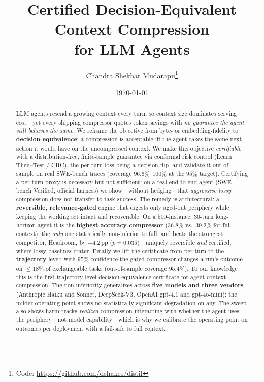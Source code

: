 \documentclass[11pt]{article}
\title{\textbf{Certified Decision-Equivalent Context Compression\\ for LLM Agents}}
\author{%
  Chandra Shekhar Mudarapu\thanks{Code: \url{https://github.com/dshakes/distil}}
}
\date{\today}
\begin{document}
\maketitle

\begin{abstract}
LLM agents resend a growing context every turn, so context size dominates serving cost---yet
every shipping compressor quotes token savings with \emph{no guarantee the agent still behaves
the same}. We reframe the objective from byte- or embedding-fidelity to
\textbf{decision-equivalence}: a compression is acceptable iff the agent takes the same next
action it would have on the uncompressed context. We make this objective \emph{certifiable}
with a distribution-free, finite-sample guarantee via conformal risk control
(Learn--Then--Test / CRC), the per-turn loss being a decision flip, and validate it
out-of-sample on real SWE-bench traces (coverage $96.6\%$--$100\%$ at the $95\%$ target).
Certifying a per-turn proxy is necessary but not sufficient: on a real end-to-end agent
(SWE-bench Verified, official harness) we show---without hedging---that \emph{aggressive lossy}
compression does not transfer to task success. The remedy is architectural: a
\textbf{reversible, relevance-gated} engine that digests only aged-out periphery while keeping
the working set intact and recoverable. On a $500$-instance, $30$-turn long-horizon agent it is
the \textbf{highest-accuracy compressor} ($36.8\%$ vs.\ $39.2\%$ for full context), the
\emph{only} one statistically non-inferior to full, and beats the strongest competitor,
Headroom, by $+4.2$\,pp ($p\!=\!0.035$)---uniquely reversible \emph{and} certified, where lossy
baselines crater. Finally we lift the certificate from per-turn to the \textbf{trajectory}
level: with $95\%$ confidence the gated compressor changes a run's outcome on $\le\!18\%$ of
exchangeable tasks (out-of-sample coverage $95.4\%$). To our knowledge this is the first
trajectory-level decision-equivalence certificate for agent context compression. The
non-inferiority generalizes across \textbf{five models and three vendors} (Anthropic Haiku and
Sonnet, DeepSeek-V3, OpenAI gpt-4.1 and gpt-4o-mini): the milder operating point shows no
statistically significant degradation on any. The sweep also shows harm tracks \emph{realized}
compression interacting with whether the agent uses the periphery---not model capability---which
is why we calibrate the operating point on outcomes per deployment with a fail-safe to full
context.
\end{abstract}
\end{document}
